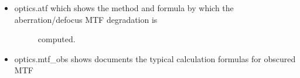 \documentclass[a4paper,10pt,english]{sphinxmanual}
\begin{document}
\begin{fulllineitems}
\begin{fulllineitems}

\begin{itemize}
\item {} \begin{description}
\item[{optics.atf which shows the method and formula by which the aberration/defocus MTF degradation is}] \leavevmode
computed.

\end{description}

\item {} 
optics.mtf\_obs shows documents the typical calculation formulas for obscured MTF

\end{itemize}



\end{fulllineitems}


\end{fulllineitems}

\end{document}
